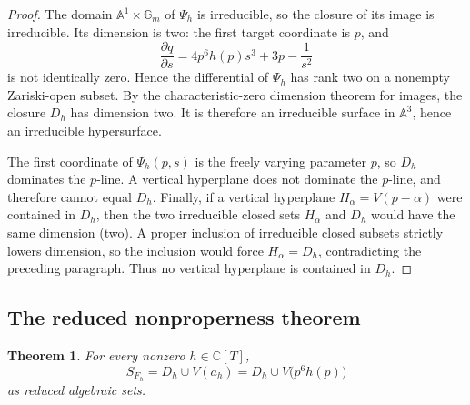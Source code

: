 \documentclass[11pt]{article}
\newtheorem{theorem}{Theorem}[section]
\newcommand{\C}{\mathbb{C}}
\newcommand{\A}{\mathbb{A}}
\newcommand{\Gm}{\mathbb{G}_{m}}
\begin{document}
\begin{proof}
The domain $\A^1\times\Gm$ of $\Psi_h$ is irreducible, so the closure of its
image is irreducible.  Its dimension is two: the first target coordinate is
$p$, and
\[
 \frac{\partial q}{\partial s}
 =4p^6h(p)s^3+3p-\frac1{s^2}
\]
is not identically zero.  Hence the differential of $\Psi_h$ has rank two on
a nonempty Zariski-open subset.  By the characteristic-zero dimension theorem
for images, the closure $D_h$ has dimension two.  It is therefore an
irreducible surface in $\A^3$, hence an irreducible hypersurface.

The first coordinate of $\Psi_h(p,s)$ is the freely varying parameter $p$, so
$D_h$ dominates the $p$-line.  A vertical hyperplane does not dominate the
$p$-line, and therefore cannot equal $D_h$.  Finally, if a vertical
hyperplane $H_\alpha=V(p-\alpha)$ were contained in $D_h$, then the two
irreducible closed sets $H_\alpha$ and $D_h$ would have the same dimension
(two).  A proper inclusion of irreducible closed subsets strictly lowers
dimension, so the inclusion would force $H_\alpha=D_h$, contradicting the
preceding paragraph.  Thus no vertical hyperplane is contained in $D_h$.
\end{proof}

\subsection{The reduced nonproperness theorem}

\begin{theorem}
\label{thm:nonproperness}
For every nonzero $h\in\C[T]$,
\begin{equation}
 \boxed{
 S_{F_h}=D_h\cup V(a_h)
 =D_h\cup V\bigl(p^6h(p)\bigr)}
 \label{eq:nonproperness}
\end{equation}
as reduced algebraic sets.
\end{theorem}
\end{document}
